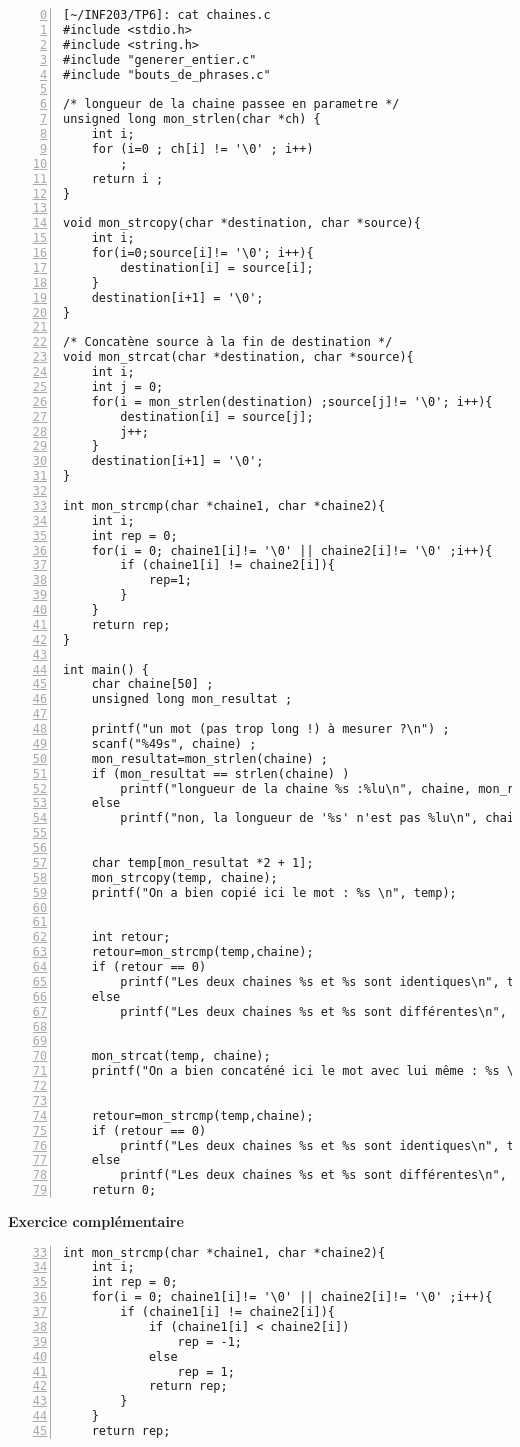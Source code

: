 \documentclass[12pt,a4paper,notitlepage,colorinlistoftodos]{article}
\begin{document}
\begin{lstlisting}[numbers=left, firstnumber = 0 ]
[~/INF203/TP6]: cat chaines.c
#include <stdio.h>
#include <string.h>
#include "generer_entier.c"
#include "bouts_de_phrases.c"

/* longueur de la chaine passee en parametre */
unsigned long mon_strlen(char *ch) {
	int i;
	for (i=0 ; ch[i] != '\0' ; i++)
		;
	return i ;
}

void mon_strcopy(char *destination, char *source){
	int i;
	for(i=0;source[i]!= '\0'; i++){
		destination[i] = source[i];
	}
	destination[i+1] = '\0';
}

/* Concatène source à la fin de destination */
void mon_strcat(char *destination, char *source){
	int i;
	int j = 0;
	for(i = mon_strlen(destination) ;source[j]!= '\0'; i++){
		destination[i] = source[j];
		j++;
	}
	destination[i+1] = '\0';
}

int mon_strcmp(char *chaine1, char *chaine2){
	int i;
	int rep = 0;
	for(i = 0; chaine1[i]!= '\0' || chaine2[i]!= '\0' ;i++){
		if (chaine1[i] != chaine2[i]){
			rep=1;
		}
	}
	return rep;
}

int main() {
	char chaine[50] ;
	unsigned long mon_resultat ;

	printf("un mot (pas trop long !) à mesurer ?\n") ;
	scanf("%49s", chaine) ;
	mon_resultat=mon_strlen(chaine) ;
	if (mon_resultat == strlen(chaine) )
		printf("longueur de la chaine %s :%lu\n", chaine, mon_resultat) ;
	else
		printf("non, la longueur de '%s' n'est pas %lu\n", chaine, mon_resultat) ;


	char temp[mon_resultat *2 + 1];
	mon_strcopy(temp, chaine);
	printf("On a bien copié ici le mot : %s \n", temp);


	int retour;
	retour=mon_strcmp(temp,chaine);
	if (retour == 0)
		printf("Les deux chaines %s et %s sont identiques\n", temp, chaine);
	else
		printf("Les deux chaines %s et %s sont différentes\n", temp, chaine);


	mon_strcat(temp, chaine);
	printf("On a bien concaténé ici le mot avec lui même : %s \n", temp);
	

	retour=mon_strcmp(temp,chaine);
	if (retour == 0)
		printf("Les deux chaines %s et %s sont identiques\n", temp, chaine);
	else
		printf("Les deux chaines %s et %s sont différentes\n", temp, chaine);
	return 0;
\end{lstlisting}

\textbf{Exercice complémentaire}
\begin{lstlisting}[numbers=left, firstnumber = 33 ]
int mon_strcmp(char *chaine1, char *chaine2){
	int i;
	int rep = 0;
	for(i = 0; chaine1[i]!= '\0' || chaine2[i]!= '\0' ;i++){
		if (chaine1[i] != chaine2[i]){
			if (chaine1[i] < chaine2[i])
				rep = -1;
			else 
				rep = 1;
			return rep;
		}
	}
	return rep;
\end{lstlisting}
\end{document}
